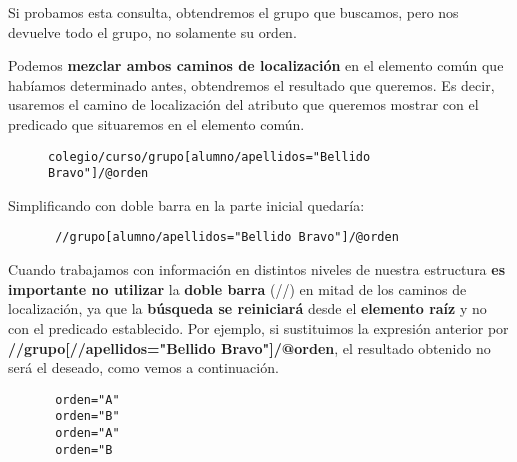         Si probamos esta consulta, obtendremos el grupo que buscamos, pero nos devuelve todo el grupo, no solamente su orden.

        Podemos \textbf{mezclar ambos caminos de localización} en el elemento común que habíamos determinado antes, obtendremos el resultado que queremos. Es decir, usaremos el camino de localización del atributo que queremos mostrar con el predicado que situaremos en el elemento común.
        \begin{figure}[H]
            \begin{tcolorbox}[sharp corners, colback=yellow!30, colframe=white!20]
                \scriptsize
                \begin{verbatim}
colegio/curso/grupo[alumno/apellidos="Bellido Bravo"]/@orden
\end{verbatim}
            \end{tcolorbox}
        \end{figure}
        Simplificando con doble barra en la parte inicial quedaría:

        \begin{figure}[H]
            \begin{tcolorbox}[sharp corners, colback=yellow!30, colframe=white!20]
                \scriptsize
\begin{verbatim}
 //grupo[alumno/apellidos="Bellido Bravo"]/@orden
\end{verbatim}
            \end{tcolorbox}
        \end{figure}

        Cuando trabajamos con información en distintos niveles de nuestra estructura \textbf{es importante no utilizar} la \textbf{doble barra} (//) en mitad de los caminos de localización, ya que la \textbf{búsqueda se reiniciará} desde el \textbf{elemento raíz} y no con el predicado establecido. Por ejemplo, si sustituimos la expresión anterior por \textbf{//grupo[//apellidos="Bellido Bravo"]/@orden}, el resultado obtenido no será el deseado, como vemos a continuación.

     \begin{figure}[H]
    \begin{tcolorbox}[sharp corners, colback=yellow!30, colframe=white!20]
        \scriptsize
\begin{verbatim}
 orden="A"
 orden="B"
 orden="A"
 orden="B
\end{verbatim}
    \end{tcolorbox}
\end{figure}

